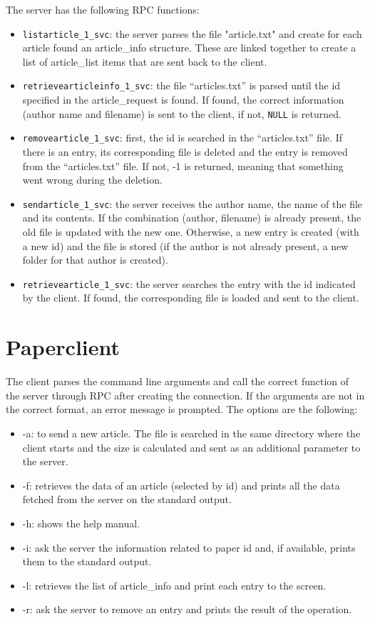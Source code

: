 The server has the following RPC functions:
\begin{itemize}
\item \texttt{listarticle\_1\_svc}: the server parses the file "article.txt" and create for each article found an article\_info structure. These are linked together to create a list of article\_list items that are sent back to the client.
\item \texttt{retrievearticleinfo\_1\_svc}: the file ``articles.txt'' is parsed until the id specified in the article\_request is found. If found, the correct information (author name and filename) is sent to the client, if not, \texttt{NULL} is returned.
\item \texttt{removearticle\_1\_svc}: first, the id is searched in the ``articles.txt'' file. If there is an entry, its corresponding file is deleted and the entry is removed from the ``articles.txt'' file. If not, -1 is returned, meaning that something went wrong during the deletion.
\item \texttt{sendarticle\_1\_svc}: the server receives the author name, the name of the file and its contents. If the combination (author, filename) is already present, the old file is updated with the new one. Otherwise, a new entry is created (with a new id) and the file is stored (if the author is not already present, a new folder for that author is created).
\item \texttt{retrievearticle\_1\_svc}: the server searches the entry with the id indicated by the client. If found, the corresponding file is loaded and sent to the client.
\end{itemize}


\section{Paperclient}
The client parses the command line arguments and call the correct function of the server through RPC after creating the connection. If the arguments are not in the correct format, an error message is prompted. The options are the following:
\begin{itemize}
	\item -a: to send a new article. The file is searched in the same directory where the client starts and the size is calculated and sent as an additional parameter to the server.
	\item -f: retrieves the data of an article (selected by id) and prints all the data fetched from the server on the standard output.
	\item -h: shows the help manual.
	\item -i: ask the server the information related to paper id and, if available, prints them to the standard output.
	\item -l: retrieves the list of article\_info and print each entry to the screen.
	\item -r: ask the server to remove an entry and prints the result of the operation.
\end{itemize}

